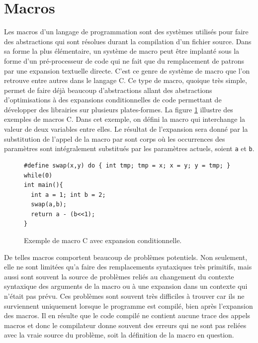 \documentclass[12pt,oneside,letterpaper,francais]{book}
\newcommand{\scheme}[1]{\selectlanguage{english}{\tt #1}\selectlanguage{french}}
\begin{document}
\section{Macros}
\label{Scheme:macros}

Les macros d'un langage de programmation sont des systèmes utilisés
pour faire des abstractions qui sont résolues durant la compilation
d'un fichier source. Dans sa forme la plus élémentaire, un système de
macro peut être implanté sous la forme d'un pré-processeur de code qui
ne fait que du remplacement de patrons par une expansion textuelle
directe. C'est ce genre de système de macro que l'on retrouve entre
autres dans le langage C. Ce type de macro, quoique très simple,
permet de faire déjà beaucoup d'abstractions allant des abstractions
d'optimisations à des expansions conditionnelles de code permettant de
développer des librairies sur plusieurs plates-formes. La figure
\ref{Scheme:c-macros} illustre des exemples de macros C. Dans cet
exemple, on défini la macro \scheme{swap} qui interchange la valeur de
deux variables entre elles. Le résultat de l'expansion sera donné par
la substitution de l'appel de la macro par sont corps où les
occurrences des paramètres sont intégralement substitués par les
paramètres actuels, soient \texttt{a} et \texttt{b}.

\begin{figure}[htb!]
  \begin{verbatim}
#define swap(x,y) do { int tmp; tmp = x; x = y; y = tmp; } while(0)
int main(){
  int a = 1; int b = 2;
  swap(a,b);
  return a - (b<<1);
}
  \end{verbatim}
  \caption{Exemple de macro C avec expansion conditionnelle.}
  \label{Scheme:c-macros}
\end{figure}

De telles macros comportent beaucoup de problèmes potentiels. Non
seulement, elle ne sont limitées qu'a faire des remplacements
syntaxiques très primitifs, mais aussi sont souvent la source de
problèmes reliés au changement du contexte syntaxique des arguments de
la macro ou à une expansion dans un contexte qui n'était pas
prévu. Ces problèmes sont souvent très difficiles à trouver car ils ne
surviennent uniquement lorsque le programme est compilé, bien après
l'expansion des macros. Il en résulte que le code compilé ne contient
aucune trace des appels macros et donc le compilateur donne souvent
des erreurs qui ne sont pas reliées avec la vraie source du problème,
soit la définition de la macro en question.
\end{document}
